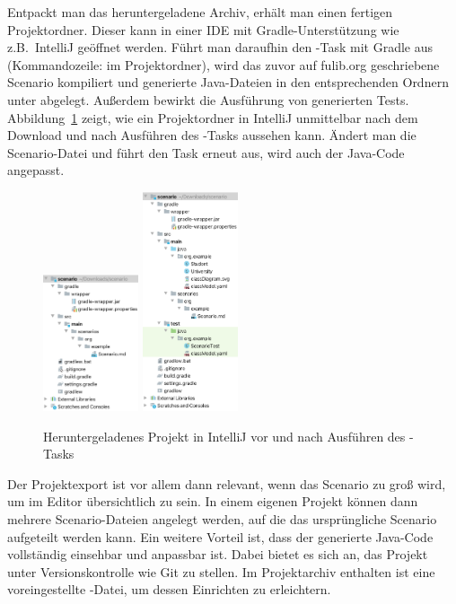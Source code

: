 Entpackt man das heruntergeladene Archiv, erhält man einen fertigen Projektordner.
Dieser kann in einer IDE mit Gradle-Unterstützung wie z.B.\ IntelliJ geöffnet werden.
Führt man daraufhin den -Task mit Gradle aus (Kommandozeile:  im Projektordner),
wird das zuvor auf fulib.org geschriebene Scenario kompiliert und generierte Java-Dateien in den entsprechenden Ordnern unter  abgelegt.
Außerdem bewirkt  die Ausführung von generierten Tests.
Abbildung~\ref{fig:project-downloaded} zeigt, wie ein Projektordner in IntelliJ unmittelbar nach dem Download und nach Ausführen des -Tasks aussehen kann.
Ändert man die Scenario-Datei und führt den Task erneut aus, wird auch der Java-Code angepasst.

\begin{figure}
    \centering
    \includegraphics[width=0.25\textwidth]{chapter/fulib.org/img/project-downloaded.png}
    \hspace{0.05\textwidth}
    \includegraphics[width=0.25\textwidth]{chapter/fulib.org/img/project-post-check.png}
    \caption{Heruntergeladenes Projekt in IntelliJ vor und nach Ausführen des -Tasks}
    \label{fig:project-downloaded}
\end{figure}

Der Projektexport ist vor allem dann relevant, wenn das Scenario zu groß wird, um im Editor übersichtlich zu sein.
In einem eigenen Projekt können dann mehrere Scenario-Dateien angelegt werden, auf die das ursprüngliche Scenario aufgeteilt werden kann.
Ein weitere Vorteil ist, dass der generierte Java-Code vollständig einsehbar und anpassbar ist.
Dabei bietet es sich an, das Projekt unter Versionskontrolle wie Git zu stellen.
Im Projektarchiv enthalten ist eine voreingestellte -Datei, um dessen Einrichten zu erleichtern.

